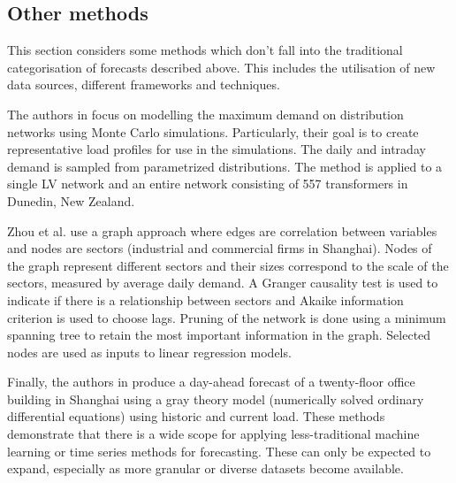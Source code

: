 \subsection{Other methods} 

This section considers some methods which don't fall into the traditional categorisation of forecasts described above. This includes the utilisation of new data sources, different frameworks and techniques. 

The authors in \cite{mcqueen2004mcs} focus on modelling the maximum demand on distribution networks using Monte Carlo simulations. Particularly, their goal is to create representative load profiles for use in the simulations. The daily and intraday demand is sampled from parametrized distributions. The method is applied to a single LV network and an entire network consisting of 557 transformers in Dunedin, New Zealand.

Zhou et al. \cite{zhou2019pse} use a graph approach where edges are correlation between variables and nodes are sectors (industrial and commercial firms in Shanghai). Nodes of the graph represent different sectors and their sizes correspond to the scale of the sectors, measured by average daily demand. A Granger causality test is used to indicate if there is a relationship between sectors and Akaike information criterion is used to choose lags. Pruning of the network is done using a minimum spanning tree to retain the most important information in the graph. Selected nodes are used as inputs to linear regression models.

Finally, the authors in \cite{xu2020ats} produce a day-ahead forecast of a twenty-floor office building in Shanghai using a gray theory model (numerically solved ordinary differential equations) using historic and current load. 
These methods demonstrate that there is a wide scope for applying less-traditional machine learning or time series methods for forecasting. These can only be expected to expand, especially as more granular or diverse datasets become available. 
